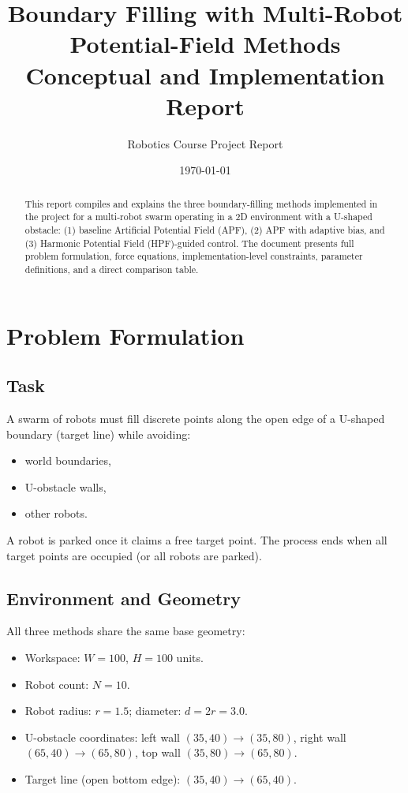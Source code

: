 \documentclass[11pt,a4paper]{article}
\title{Boundary Filling with Multi-Robot Potential-Field Methods\\Conceptual and Implementation Report}
\author{Robotics Course Project Report}
\date{\today}
\begin{document}
\maketitle

\begin{abstract}
This report compiles and explains the three boundary-filling methods implemented in the project for a multi-robot swarm operating in a 2D environment with a U-shaped obstacle:
(1) baseline Artificial Potential Field (APF),
(2) APF with adaptive bias,
and (3) Harmonic Potential Field (HPF)-guided control.
The document presents full problem formulation, force equations, implementation-level constraints, parameter definitions, and a direct comparison table.
\end{abstract}

\section{Problem Formulation}

\subsection{Task}
A swarm of robots must fill discrete points along the open edge of a U-shaped boundary (target line) while avoiding:
\begin{itemize}[leftmargin=1.2em]
    \item world boundaries,
    \item U-obstacle walls,
    \item other robots.
\end{itemize}
A robot is parked once it claims a free target point. The process ends when all target points are occupied (or all robots are parked).

\subsection{Environment and Geometry}
All three methods share the same base geometry:
\begin{itemize}[leftmargin=1.2em]
    \item Workspace: $W=100$, $H=100$ units.
    \item Robot count: $N=10$.
    \item Robot radius: $r=1.5$; diameter: $d=2r=3.0$.
    \item U-obstacle coordinates: left wall $(35,40)\rightarrow(35,80)$, right wall $(65,40)\rightarrow(65,80)$, top wall $(35,80)\rightarrow(65,80)$.
    \item Target line (open bottom edge): $(35,40)\rightarrow(65,40)$.
\end{itemize}
\end{document}
